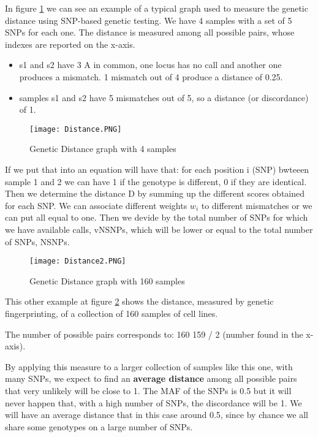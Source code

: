 In figure \ref{fig:Distance} we can see an example of a typical graph used to measure the genetic distance using SNP-based genetic testing. We have 4 samples with a set of 5 SNPs for each one. The distance is measured among all possible pairs, whose indexes are reported on the x-axis. 
\begin{itemize}
	\item s1 and s2 have 3 A in common, one locus has no call and another one produces a mismatch. 1 mismatch out of 4 produce a distance of 0.25.
	\item samples s1 and s2 have 5 mismatches out of 5, so a distance (or discordance) of 1. 
\end{itemize}

\begin{figure}
	\centering
	\texttt{[image: Distance.PNG]}
	\caption{\label{fig:Distance}Genetic Distance graph with 4 samples}
\end{figure}

If we put that into an equation will have that: for each position i (SNP) bwteeen sample 1 and 2 we can have 1 if the genotype is different, 0 if they are identical. Then we determine the distance D by summing up the different scores obtained for each SNP. We can associate different weights $w_i$ to different mismatches or we can put all equal to one. Then we devide by the total number of SNPs for which we have available calls, vNSNPs, which will be lower or equal to the total number of SNPs, NSNPs. 

%
\begin{figure}
	\centering
	\texttt{[image: Distance2.PNG]}
	\caption{\label{fig:Distance2}Genetic Distance graph with 160 samples}
\end{figure}

\bigskip
This other example at figure \ref{fig:Distance2} shows the distance, measured by genetic fingerprinting, of a collection of 160 samples of cell lines. 

The number of possible pairs corresponds to: 160  159 / 2 (number found in the x-axis). 

By applying this measure to a larger collection of samples like this one, with many SNPs, we expect to find an \textbf{average distance} among all possible pairs that very unlikely will be close to 1. 
The MAF of the SNPs is 0.5 but it will never happen that, with a high number of SNPs, the discordance will be 1. We will have an average distance that in this case around 0.5, since by chance we all share some genotypes on a large number of SNPs. 

